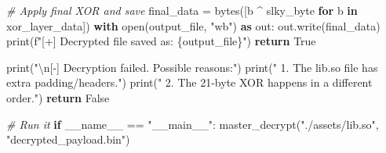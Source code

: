 \documentclass[
]{article}
\newenvironment{Shaded}{}{}
\newcommand{\BuiltInTok}[1]{\textcolor[rgb]{0.00,0.50,0.00}{#1}}
\newcommand{\CharTok}[1]{\textcolor[rgb]{0.25,0.44,0.63}{#1}}
\newcommand{\CommentTok}[1]{\textcolor[rgb]{0.38,0.63,0.69}{\textit{#1}}}
\newcommand{\ControlFlowTok}[1]{\textcolor[rgb]{0.00,0.44,0.13}{\textbf{#1}}}
\newcommand{\ImportTok}[1]{\textcolor[rgb]{0.00,0.50,0.00}{\textbf{#1}}}
\newcommand{\KeywordTok}[1]{\textcolor[rgb]{0.00,0.44,0.13}{\textbf{#1}}}
\newcommand{\NormalTok}[1]{#1}
\newcommand{\OperatorTok}[1]{\textcolor[rgb]{0.40,0.40,0.40}{#1}}
\newcommand{\SpecialCharTok}[1]{\textcolor[rgb]{0.25,0.44,0.63}{#1}}
\newcommand{\SpecialStringTok}[1]{\textcolor[rgb]{0.73,0.40,0.53}{#1}}
\newcommand{\StringTok}[1]{\textcolor[rgb]{0.25,0.44,0.63}{#1}}
\newcommand{\VariableTok}[1]{\textcolor[rgb]{0.10,0.09,0.49}{#1}}
\begin{document}
\begin{Shaded}
\begin{Highlighting}[]
                \CommentTok{\# Apply final XOR and save}
\NormalTok{                final\_data }\OperatorTok{=} \BuiltInTok{bytes}\NormalTok{([b }\OperatorTok{\^{}}\NormalTok{ slky\_byte }\ControlFlowTok{for}\NormalTok{ b }\KeywordTok{in}\NormalTok{ xor\_layer\_data])}
                \ControlFlowTok{with} \BuiltInTok{open}\NormalTok{(output\_file, }\StringTok{"wb"}\NormalTok{) }\ImportTok{as}\NormalTok{ out:}
\NormalTok{                    out.write(final\_data)}
                \BuiltInTok{print}\NormalTok{(}\SpecialStringTok{f"[+] Decrypted file saved as: }\SpecialCharTok{\{}\NormalTok{output\_file}\SpecialCharTok{\}}\SpecialStringTok{"}\NormalTok{)}
                \ControlFlowTok{return} \VariableTok{True}

    \BuiltInTok{print}\NormalTok{(}\StringTok{"}\CharTok{\textbackslash{}n}\StringTok{[{-}] Decryption failed. Possible reasons:"}\NormalTok{)}
    \BuiltInTok{print}\NormalTok{(}\StringTok{"    1. The lib.so file has extra padding/headers."}\NormalTok{)}
    \BuiltInTok{print}\NormalTok{(}\StringTok{"    2. The 21{-}byte XOR happens in a different order."}\NormalTok{)}
    \ControlFlowTok{return} \VariableTok{False}

\CommentTok{\# Run it}
\ControlFlowTok{if} \VariableTok{\_\_name\_\_} \OperatorTok{==} \StringTok{"\_\_main\_\_"}\NormalTok{:}
\NormalTok{    master\_decrypt(}\StringTok{"./assets/lib.so"}\NormalTok{, }\StringTok{"decrypted\_payload.bin"}\NormalTok{)}
\end{Highlighting}
\end{Shaded}
\end{document}

